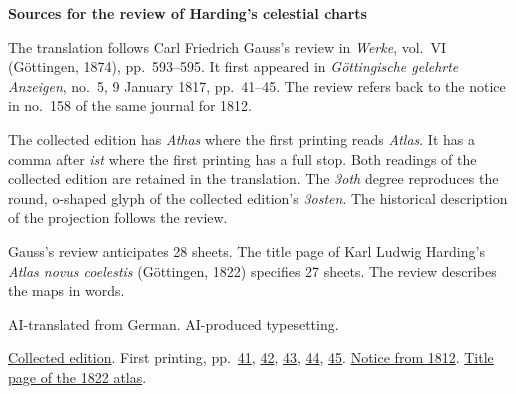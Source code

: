 \clearpage\thispagestyle{empty}
\begin{center}\Large\bfseries Sources for the review of Harding’s celestial charts\end{center}

The translation follows Carl Friedrich Gauss’s review in \emph{Werke}, vol.~VI (Göttingen, 1874), pp.~593--595. It first appeared in \emph{Göttingische gelehrte Anzeigen}, no.~5, 9 January 1817, pp.~41--45. The review refers back to the notice in no.~158 of the same journal for 1812.

The collected edition has \emph{Athas} where the first printing reads \emph{Atlas}. It has a comma after \emph{ist} where the first printing has a full stop. Both readings of the collected edition are retained in the translation. The \emph{3oth} degree reproduces the round, o-shaped glyph of the collected edition’s \emph{3osten}. The historical description of the projection follows the review.

Gauss’s review anticipates 28 sheets. The title page of Karl Ludwig Harding’s \emph{Atlas novus coelestis} (Göttingen, 1822) specifies 27 sheets. The review describes the maps in words.

AI-translated from German. AI-produced typesetting.

\href{https://gdz.sub.uni-goettingen.de/id/PPN236007467}{Collected edition}. First printing, pp.~\href{https://images.p.sub.uni-goettingen.de/iiif/image/gdz:PPN319721507_1817:00000043/full/1650,/0/default.jpg}{41}, \href{https://images.p.sub.uni-goettingen.de/iiif/image/gdz:PPN319721507_1817:00000044/full/1650,/0/default.jpg}{42}, \href{https://images.p.sub.uni-goettingen.de/iiif/image/gdz:PPN319721507_1817:00000045/full/1650,/0/default.jpg}{43}, \href{https://images.p.sub.uni-goettingen.de/iiif/image/gdz:PPN319721507_1817:00000046/full/1650,/0/default.jpg}{44}, \href{https://images.p.sub.uni-goettingen.de/iiif/image/gdz:PPN319721507_1817:00000047/full/1650,/0/default.jpg}{45}. \href{https://images.p.sub.uni-goettingen.de/iiif/image/gdz:PPN319721507_1812:00001613/full/1650,/0/default.jpg}{Notice from 1812}. \href{https://www.davidrumsey.com/luna/servlet/detail/RUMSEY~8~1~372238~90138977:Title--Atlas-novus-coelestis-XXVII-}{Title page of the 1822 atlas}.

\clearpage
